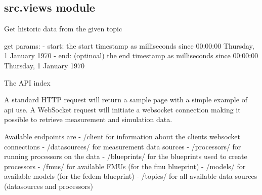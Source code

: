 \documentclass[letterpaper,10pt,english]{sphinxmanual}
\begin{document}
\subsection{src.views module}
\label{\detokenize{src:module-src.views}}\label{\detokenize{src:src-views-module}}

\begin{fulllineitems}
\label{\detokenize{src:src.views.history}}
Get historic data from the given topic

get params:
- start: the start timestamp as milliseconds since 00:00:00 Thursday, 1 January 1970
- end: (optinoal) the end timestamp as milliseconds since 00:00:00 Thursday, 1 January 1970

\end{fulllineitems}


\begin{fulllineitems}
\label{\detokenize{src:src.views.index}}
The API index

A standard HTTP request will return a sample page with a simple example of api use.
A WebSocket request will initiate a websocket connection making it possible to retrieve measurement and simulation data.

Available endpoints are
- /client for information about the clients websocket connections
- /datasources/ for measurement data sources
- /processors/ for running processors on the data
- /blueprints/ for the blueprints used to create processors
- /fmus/ for available FMUs (for the fmu blueprint)
- /models/ for available models (for the fedem blueprint)
- /topics/ for all available data sources (datasources and processors)

\end{fulllineitems}

\end{document}
